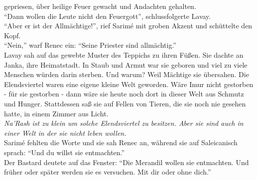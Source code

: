 gepriesen, über heilige Feuer gewacht und Andachten gehalten.\\
``Dann wollen die Leute nicht den Feuergott'', schlussfolgerte Lavay.\\
``Aber er ist der Allmächtige!'', rief Sarimé mit groben Akzent und schüttelte den Kopf.\\
``Nein,'' warf Renec ein: ``Seine Priester sind allmächtig.''\\
Lavay sah auf das gewebte Muster des Teppichs zu ihren Füßen. Sie dachte an Janka, ihre 
Heimatstadt. In Staub und Armut war sie geboren und viel zu viele Menschen würden darin sterben. 
Und warum? Weil Mächtige sie übersahen. Die Elendsviertel waren eine eigene kleine Welt geworden. 
Wäre Imur nicht gestorben - für sie gestorben - dann wäre sie heute noch dort in 
dieser Welt aus Schmutz und Hunger. Stattdessen saß sie auf Fellen von Tieren, die sie noch nie 
gesehen hatte, in einem Zimmer aus Licht.\\
\textit{Na'Rash ist zu klein um solche Elendsviertel zu besitzen. Aber sie sind auch in einer 
Welt in der sie nicht leben wollen.}\\
Sarimé fehlten die Worte und sie sah Renec an, während sie auf Saleicanisch sprach: ``Und du willst 
sie entmachten.''\\
Der Bastard deutete auf das Fenster: ``Die Merandil wollen sie entmachten. Und früher oder später 
werden sie es versuchen. Mit dir oder ohne dich.''\\

